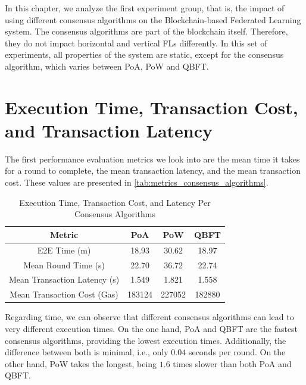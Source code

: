 In this chapter, we analyze the first experiment group, that is, the impact of using different consensus algorithms on the Blockchain-based Federated Learning system. The consensus algorithms are part of the blockchain itself. Therefore, they do not impact horizontal and vertical FLs differently. In this set of experiments, all properties of the system are static, except for the consensus algorithm, which varies between PoA, PoW and QBFT.

\section{Execution Time, Transaction Cost, and Transaction Latency}

The first performance evaluation metrics we look into are the mean time it takes for a round to complete, the mean transaction latency, and the mean transaction cost. These values are presented in \autoref{tab:metrics_consensus_algorithms}.

\begin{table}[!ht]
\centering
\begin{tabular}{c|c|c|c} \hline \hline
Metric                              & PoA    & PoW    & QBFT   \\ \hline \hline
E2E Time (m)            & 18.93  & 30.62  & 18.97  \\ \hline
Mean Round Time (s)             & 22.70  & 36.72  & 22.74  \\ \hline
Mean Transaction Latency (s)    & 1.549  & 1.821  & 1.558  \\ \hline
Mean Transaction Cost (Gas)     & 183124 & 227052 & 182880 \\ \hline
\end{tabular}
\caption{Execution Time, Transaction Cost, and Latency Per Consensus Algorithms}
\label{tab:metrics_consensus_algorithms}
\end{table}

Regarding time, we can observe that different consensus algorithms can lead to very different execution times. On the one hand, PoA and QBFT are the fastest consensus algorithms, providing the lowest execution times. Additionally, the difference between both is minimal, i.e., only $0.04$ seconds per round. On the other hand, PoW takes the longest, being $1.6$ times slower than both PoA and QBFT.

